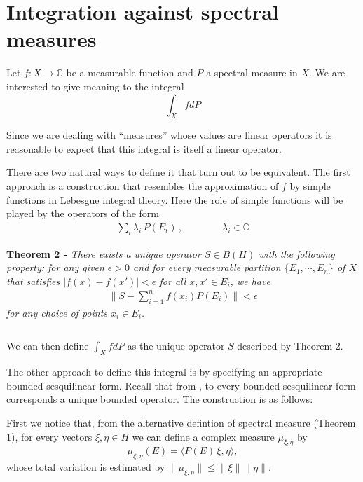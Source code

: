 \documentclass[12pt]{article}
\begin{document}
\section{Integration against spectral measures}

Let $f :X \longrightarrow \mathbb{C}$ be a  measurable function and $P$ a spectral measure in $X$. We are interested to give meaning to the integral
\begin{displaymath}
\int_X f dP
\end{displaymath}

Since we are dealing with ``measures'' whose values are linear operators it is reasonable to expect that this integral is itself a linear operator.

There are two natural ways to define it that turn out to be equivalent. The first approach is a construction that resembles the approximation of $f$ by simple functions in Lebesgue integral theory. Here the role of simple functions will be played by the operators of the form
\begin{align*}
\sum_i \lambda_i\, P(E_i)\,, \qquad\qquad \lambda_i \in \mathbb{C}
\end{align*}

{\bf Theorem 2 -} \emph{There exists a unique operator $S \in B(H)$ with the following property: for any given $\epsilon >0$ and for every measurable partition $\{E_1, \cdots, E_n\}$ of $X$ that satisfies $|f(x)-f(x')| < \epsilon$ for all $x, x' \in E_i$, we have}
\begin{align*}
\|S - \sum_{i=1}^n f(x_i) P(E_i)\| < \epsilon
\end{align*}
\emph{for any choice of points $x_i \in E_i$.}

$\,$

We can then define $\displaystyle \int_X f dP$ as the unique operator $S$ described by Theorem 2.

The other approach to define this integral is by specifying an appropriate bounded sesquilinear form. Recall that from , to every bounded sesquilinear form corresponds a unique bounded operator. The construction is as follows:

First we notice that, from the alternative defintion of spectral measure (Theorem 1), for every vectors $\xi, \eta \in H$ we can define a complex measure $\mu_{\xi, \eta}$ by
\begin{displaymath}
\mu_{\xi, \eta}(E) = \langle P(E)\,\xi, \eta \rangle,
\end{displaymath}
whose total variation is estimated by $\|\mu_{\xi, \eta}\| \leq \|\xi\| \|\eta\|$.
\end{document}
